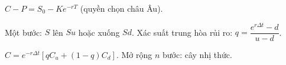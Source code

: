 \documentclass[12pt,a4paper]{article}
\begin{document}
\begin{dinhly}[title={Ngang giá Put--Call}]
  $C - P = S_0 - Ke^{-rT}$ (quyền chọn châu Âu).
\end{dinhly}

\begin{phuongphap}[title={Mô hình nhị thức (CRR)}]
  Một bước: $S$ lên $Su$ hoặc xuống $Sd$. Xác suất trung hòa rủi ro: $q = \dfrac{e^{r\Delta t} - d}{u - d}$.

  $C = e^{-r\Delta t}[qC_u + (1-q)C_d]$. Mở rộng $n$ bước: cây nhị thức.
\end{phuongphap}
\end{document}
